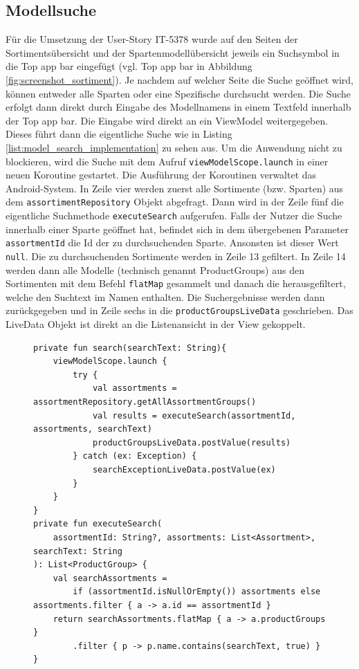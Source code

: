 \FloatBarrier
\subsection{Modellsuche}
Für die Umsetzung der User-Story IT-5378 wurde auf den Seiten der Sortimentsübersicht und der Spartenmodellübersicht jeweils ein Suchsymbol in die Top app bar eingefügt (vgl. Top app bar in Abbildung \ref{fig:screenshot_sortiment}). Je nachdem auf welcher Seite die Suche geöffnet wird, können entweder alle Sparten oder eine Spezifische durchsucht werden. Die Suche erfolgt dann direkt durch Eingabe des Modellnamens in einem Textfeld innerhalb der Top app bar. Die Eingabe wird direkt an ein ViewModel weitergegeben. Dieses führt dann die eigentliche Suche wie in Listing \ref{list:model_search_implementation} zu sehen aus. Um die Anwendung nicht zu blockieren, wird die Suche mit dem Aufruf \texttt{viewModelScope.launch} in einer neuen Koroutine gestartet. Die Ausführung der Koroutinen verwaltet das Android-System. In Zeile vier werden zuerst alle Sortimente (bzw. Sparten) aus dem \texttt{assortimentRepository} Objekt abgefragt. Dann wird in der Zeile fünf die eigentliche Suchmethode \texttt{executeSearch} aufgerufen. Falls der Nutzer die Suche innerhalb einer Sparte geöffnet hat, befindet sich in dem übergebenen Parameter \texttt{assortmentId} die Id der zu durchsuchenden Sparte. Ansonsten ist dieser Wert \texttt{null}. Die zu durchsuchenden Sortimente werden in Zeile 13 gefiltert. In Zeile 14 werden dann alle Modelle (technisch genannt ProductGroups) aus den Sortimenten mit dem Befehl \texttt{flatMap} gesammelt und danach die herausgefiltert, welche den Suchtext im Namen enthalten. Die Suchergebnisse werden dann zurückgegeben und in Zeile sechs in die \texttt{productGroupsLiveData} geschrieben. Das LiveData Objekt ist direkt an die Listenansicht in der View gekoppelt.

\begin{figure}[!htb]
    \begin{lstlisting}[caption=Implementierung der asynchronen Modellsuche, label=list:model_search_implementation]
private fun search(searchText: String){
    viewModelScope.launch {
        try {
            val assortments = assortmentRepository.getAllAssortmentGroups()
            val results = executeSearch(assortmentId, assortments, searchText)
            productGroupsLiveData.postValue(results)
        } catch (ex: Exception) {
            searchExceptionLiveData.postValue(ex)
        }
    }
}
private fun executeSearch(
    assortmentId: String?, assortments: List<Assortment>, searchText: String
): List<ProductGroup> {
    val searchAssortments =
        if (assortmentId.isNullOrEmpty()) assortments else assortments.filter { a -> a.id == assortmentId }
    return searchAssortments.flatMap { a -> a.productGroups }
        .filter { p -> p.name.contains(searchText, true) }
}
    \end{lstlisting}
\end{figure}

